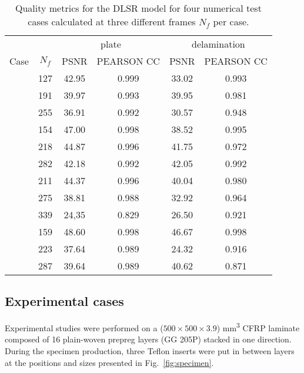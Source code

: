 \begin{table}[!h]
	\centering \footnotesize
	\caption{Quality metrics for the DLSR model for four numerical test cases calculated at three different frames $N_f$ per case.}	
	\begin{tabular}{lccccc}
		\toprule
		& & \multicolumn{2}{c}{plate} & \multicolumn{2}{c}{delamination} \\
		\cmidrule(lr){3-4} \cmidrule(lr){5-6}
		Case & $N_f$ & PSNR & PEARSON CC & PSNR & PEARSON CC \\ 
		\midrule
		\multirow{3}{*}{}  & 127  & 42.95 & 0.999 & 33.02 & 0.993 \\
		\multirow{3}{*}{} 1 & 191  & 39.97 & 0.993 & 39.95 & 0.981 \\
		\multirow{3}{*}{}  & 255 & 36.91 & 0.992 & 30.57 & 0.948 \\ 
		\midrule
		\multirow{3}{*}{}  & 154 & 47.00 & 0.998 & 38.52 & 0.995 \\
		\multirow{3}{*}{} 2 & 218 & 44.87 & 0.996 & 41.75 & 0.972\\
		\multirow{3}{*}{}  & 282 & 42.18 & 0.992 & 42.05 & 0.992 \\ 
		\midrule
		\multirow{3}{*}{}  & 211 & 44.37 & 0.996 & 40.04 & 0.980 \\
		\multirow{3}{*}{} 3 & 275 & 38.81 & 0.988 & 32.92 & 0.964 \\
		\multirow{3}{*}{}  & 339 & 24,35 & 0.829 & 26.50 & 0.921 \\ 
		\midrule
		\multirow{3}{*}{}  & 159 & 48.60 & 0.998 & 46.67 & 0.998 \\
		\multirow{3}{*}{} 4 & 223 & 37.64 & 0.989 & 24.32 & 0.916 \\
		\multirow{3}{*}{}  & 287 & 39.64 & 0.989 & 40.62 & 0.871 \\ 		
		\bottomrule
	\end{tabular}
	\label{tab:num_DLSR_results}
\end{table}

\clearpage

\subsection{Experimental cases}
\label{sec542}
Experimental studies were performed on a ($500 \times 500\times 3.9$) mm\textsuperscript{3} CFRP laminate composed of 16 plain-woven prepreg layers (GG 205P) stacked in one direction. 
During the specimen production, three Teflon inserts were put in between layers at the positions and sizes presented in Fig.~\ref{fig:specimen}.

